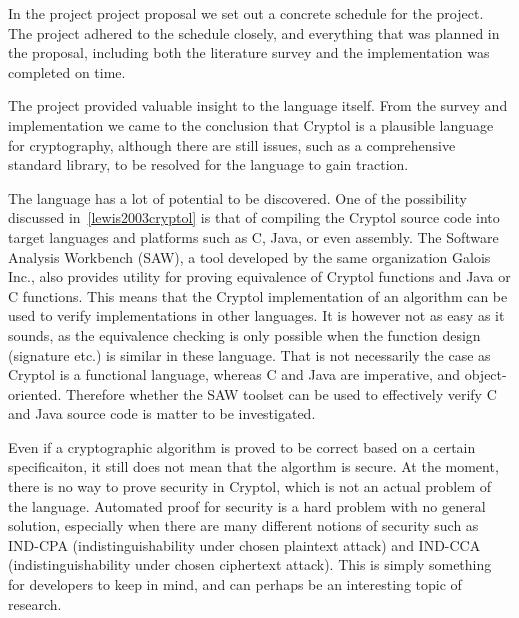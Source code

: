 \documentclass[a4paper, notitlepage]{report}
\begin{document}
In the project project proposal we set out a concrete schedule for the project.
The project adhered to the schedule closely, and everything 
that was planned in the proposal, including both the literature survey and 
the implementation was completed on time.

The project provided valuable insight to the language itself. From the survey
and implementation we came to the conclusion that Cryptol is a plausible language 
for cryptography, although there are still issues, such as a comprehensive standard 
library, to be resolved for the language to gain traction. 

The language has a lot of potential to be discovered. 
One of the possibility discussed in~\ref{lewis2003cryptol} is that of compiling 
the Cryptol source code into target languages and platforms such as C, Java, or
even assembly. The Software Analysis Workbench (SAW), a tool developed by the same
organization Galois Inc., also provides utility for proving equivalence of Cryptol 
functions and Java or C functions. 
This means that the Cryptol implementation of an algorithm can be used to verify 
implementations in other languages. It is however not as easy as it sounds, 
as the equivalence checking is only possible when the function design (signature etc.)
is similar in these language. That is not necessarily the case as Cryptol
is a functional language, whereas C and Java are imperative, and object-oriented.
Therefore whether the SAW toolset can be used to effectively verify C and Java source
code is matter to be investigated.




Even if a cryptographic algorithm is proved to be correct based on a certain 
specificaiton, it still does
not mean that the algorthm is secure. 
At the moment, there is no way to prove security in Cryptol, 
which is not an actual problem of the language. 
Automated proof for security is a hard problem with no general solution, 
especially when there are many different notions of security such as 
IND-CPA (indistinguishability under chosen plaintext attack) and 
IND-CCA (indistinguishability under chosen ciphertext attack).
This is simply something for developers to keep in mind, and can perhaps
be an interesting topic of research.


\newpage



\end{document}
